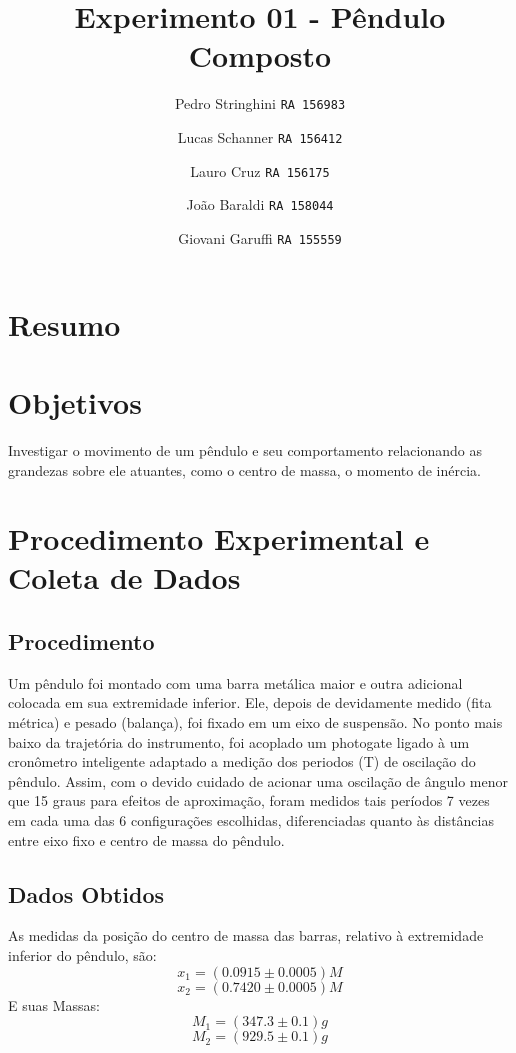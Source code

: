 \documentclass[12pt,a4paper]{article}
\begin{document}
\title{Experimento 01 - Pêndulo Composto}
\author{Pedro Stringhini 
		\texttt{RA 156983}
		\and
		Lucas Schanner 
		\texttt{RA 156412}
		\and
		Lauro Cruz
		\texttt{RA 156175}
		\and
		João Baraldi
		\texttt{RA 158044}
		\and
		Giovani Garuffi
		\texttt{RA 155559}
		}
\maketitle
\newpage
\section{Resumo}

\section{Objetivos}
Investigar o movimento de um pêndulo e seu comportamento relacionando as grandezas sobre ele atuantes, como o centro de massa, o momento de inércia.

\section{Procedimento Experimental e Coleta de Dados}
\subsection{Procedimento}

Um pêndulo foi montado com uma barra metálica maior e outra adicional colocada em sua extremidade inferior. Ele, depois de devidamente medido (fita métrica) e pesado (balança), foi fixado em um eixo de suspensão. No ponto mais baixo da trajetória do instrumento, foi acoplado um photogate ligado à um cronômetro inteligente adaptado a medição dos periodos (T) de oscilação do pêndulo. Assim, com o devido cuidado de acionar uma oscilação de ângulo menor que 15 graus para efeitos de aproximação, foram medidos tais períodos 7 vezes em cada uma das 6 configurações escolhidas, diferenciadas quanto às distâncias entre eixo fixo e centro de massa do pêndulo.\\

\subsection{Dados Obtidos}

As medidas da posição do centro de massa das barras, relativo à extremidade inferior do pêndulo, são: \\
$$ x_1 = (0.0915 \pm 0.0005) M$$
$$ x_2 = (0.7420 \pm 0.0005) M$$
E suas Massas:\\
$$ M_1 = (347.3 \pm 0.1) g $$
$$ M_2 = (929.5 \pm 0.1) g $$
\end{document}

